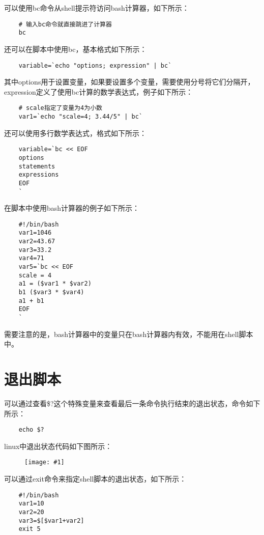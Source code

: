 \documentclass[a4paper,left=1.5cm,right=1.5cm,11pt]{article}
\newcommand{\fic}[1]{\begin{figure}[H]
		\center
		\texttt{[image: \#1]}
	\end{figure}}
\begin{document}
	可以使用bc命令从shell提示符访问bash计算器，如下所示：
	\begin{lstlisting}
	# 输入bc命令就直接跳进了计算器
	bc
	\end{lstlisting}

	还可以在脚本中使用bc，基本格式如下所示：
	\begin{lstlisting}
	variable=`echo "options; expression" | bc`
	\end{lstlisting}

	其中options用于设置变量，如果要设置多个变量，需要使用分号将它们分隔开，expression定义了使用bc计算的数学表达式，例子如下所示：
	\begin{lstlisting}
	# scale指定了变量为4为小数
	var1=`echo "scale=4; 3.44/5" | bc`
	\end{lstlisting}

	还可以使用多行数学表达式，格式如下所示：
	\begin{lstlisting}
	variable=`bc << EOF
	options
	statements
	expressions
	EOF
	`
	\end{lstlisting}

	在脚本中使用bash计算器的例子如下所示：
	\begin{lstlisting}
	#!/bin/bash
	var1=1046
	var2=43.67
	var3=33.2
	var4=71
	var5=`bc << EOF
	scale = 4
	a1 = ($var1 * $var2)
	b1 ($var3 * $var4)
	a1 + b1
	EOF
	`
	\end{lstlisting}

	需要注意的是，bash计算器中的变量只在bash计算器内有效，不能用在shell脚本中。

\section{退出脚本}
	可以通过查看\$?这个特殊变量来查看最后一条命令执行结束的退出状态，命令如下所示：
	\begin{lstlisting}
	echo $?
	\end{lstlisting}

	linux中退出状态代码如下图所示：
	\fic{5.png}

	可以通过exit命令来指定shell脚本的退出状态，如下所示：
	\begin{lstlisting}
	#!/bin/bash
	var1=10
	var2=20
	var3=$[$var1+var2]
	exit 5
	\end{lstlisting}
\end{document}
